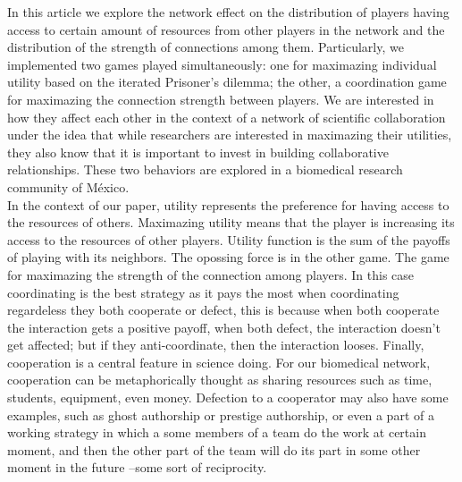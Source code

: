 \documentclass[11pt]{article}
\begin{document}

 {\color{red}In this article we explore the network effect on the distribution
   of players having access to certain amount of resources from other players in the
   network and the distribution of the strength of connections among
   them. Particularly, we implemented two games played simultaneously: 
   one for maximazing individual utility based on the iterated Prisoner's
   dilemma; the other, a coordination game for maximazing the connection strength between
   players. We are interested in how they affect each other in 
   the context of a network of scientific collaboration under the idea that while
   researchers are interested in maximazing their utilities, they also know that
   it is important to invest in building collaborative relationships. These two
   behaviors are explored in a biomedical research community of M\'exico.}\\    

{\color{red}In the context of our paper, utility represents
  the preference for having access to the resources of others. Maximazing
  utility means that the player is increasing its access to the resources of
  other players.  Utility function is the sum of the payoffs of playing
  with its neighbors. The opossing force is in the other game. The game for
  maximazing the strength of the connection among players. In this case
  coordinating is the best strategy as it pays the most when
  coordinating regardeless they both cooperate or defect, this is because when
  both cooperate the interaction gets a positive payoff, when both defect, the
  interaction doesn't get affected; but if they anti-coordinate, then the
  interaction looses. Finally, cooperation is a central feature in science
  doing. For our biomedical network, cooperation can be metaphorically thought
  as sharing resources such as time, students, equipment, even money. Defection
  to a cooperator may also have some examples, such as ghost authorship or
  prestige authorship, or even a part of a working strategy in which a some
  members of a team do the work at certain moment, and then the other part of
  the team will do its part in some other moment in the future --some sort of
  reciprocity. }\\
\end{document}
